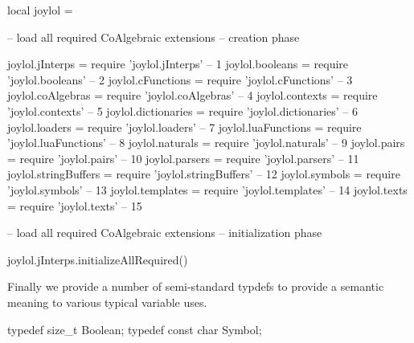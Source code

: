 \startLuaCode
local joylol = { }

-- load all required CoAlgebraic extensions -- creation phase

joylol.jInterps      = require 'joylol.jInterps'       --  1
joylol.booleans      = require 'joylol.booleans'       --  2
joylol.cFunctions    = require 'joylol.cFunctions'     --  3
joylol.coAlgebras    = require 'joylol.coAlgebras'     --  4
joylol.contexts      = require 'joylol.contexts'       --  5
joylol.dictionaries  = require 'joylol.dictionaries'   --  6
joylol.loaders       = require 'joylol.loaders'        --  7
joylol.luaFunctions  = require 'joylol.luaFunctions'   --  8
joylol.naturals      = require 'joylol.naturals'       --  9
joylol.pairs         = require 'joylol.pairs'          -- 10
joylol.parsers       = require 'joylol.parsers'        -- 11
joylol.stringBuffers = require 'joylol.stringBuffers'  -- 12
joylol.symbols       = require 'joylol.symbols'        -- 13
joylol.templates     = require 'joylol.templates'      -- 14
joylol.texts         = require 'joylol.texts'          -- 15

-- load all required CoAlgebraic extensions -- initialization phase

joylol.jInterps.initializeAllRequired()

\stopLuaCode

Finally we provide a number of semi-standard typdefs to provide a semantic 
meaning to various typical variable uses. 

\startCHeader
typedef size_t     Boolean;
typedef const char Symbol;
\stopCHeader
